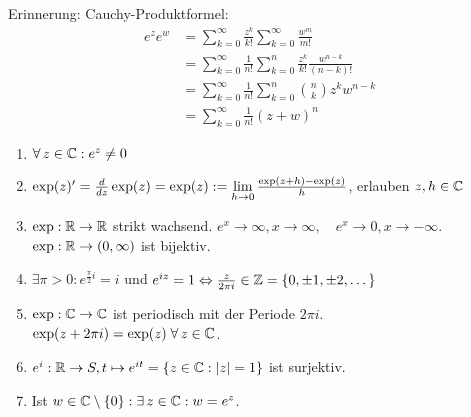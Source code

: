 \documentclass[../ana2.tex]{subfiles}
\begin{document}
Erinnerung: Cauchy-Produktformel: 
\begin{align*}
    e^z e^w &= \sum_{k=0}^\infty \frac{z^k}{k!} 
    \sum_{k=0}^\infty \frac{w^m}{m!} \\
    &= \sum_{k=0}^\infty \frac{1}{n!} 
    \sum_{k=0}^n \frac{z^k}{k!} \frac{w^{n-k}}{(n-k)!} \\
    &= \sum_{k=0}^\infty \frac{1}{n!} 
    \sum_{k=0}^n \binom{n}{k} z^k w^{n-k} \\
    &= \sum_{k=0}^\infty \frac{1}{n!} (z + w)^n
\end{align*}
\begin{satz}\leavevmode
    \begin{enumerate}[label=(\alph*)]
        \item \( \forall z \in \C: e^z \neq 0 \)
        \item \( \exp(z)' = \frac{d}{dz} \exp(z) = \exp(z) 
        := \lim\limits_{h\rightarrow{}0} \frac{\exp(z+h) - \exp(z)}{h} \), erlauben 
        \( z,h \in \mathbb{C} \)
        \item \( \exp:\mathbb{R}\rightarrow \mathbb{R} \) strikt wachsend. 
        \( e^x \rightarrow \infty, x \rightarrow \infty, \quad
        e^x \rightarrow 0, x\rightarrow -\infty \). \\
        \( \exp:\mathbb{R}\rightarrow (0,\infty) \) ist bijektiv.
        \item \( \exists \pi > 0: e^{\frac{\pi}{2}i} = i \) und
        \( e^{iz} = 1 \Leftrightarrow \frac{z}{2\pi i} \in \mathbb{Z}
        = \{0, \pm 1, \pm 2, \dots\} \)
        \item \( \exp:\mathbb{C}\rightarrow \mathbb{C} \) ist periodisch mit 
        der Periode \( 2\pi i \). 
        \( \exp(z + 2\pi i) = \exp(z) \;\forall z\in\C \).
        \item \( e^i:\mathbb{R}\rightarrow S, t \mapsto e^{it}
        = \{z \in \mathbb{C}: \left|z\right| = 1\} \) ist surjektiv.
        \item Ist \( w \in \C \setminus \set{0}: 
        \exists z \in \C: w = e^z \).
    \end{enumerate}
\end{satz}
\end{document}
